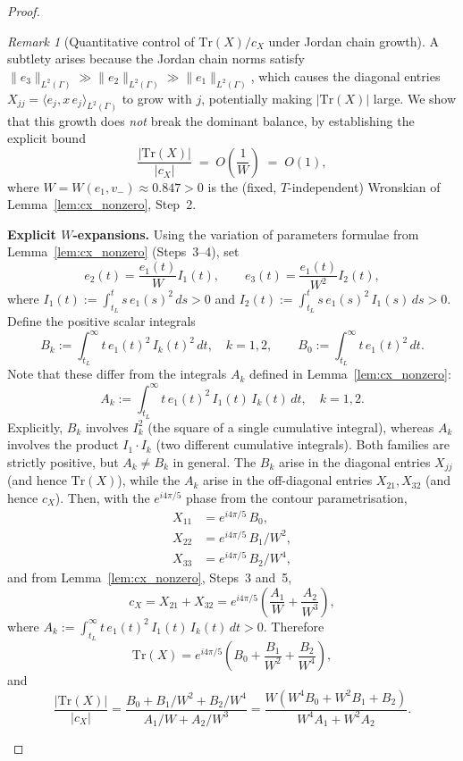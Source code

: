 \documentclass[12pt,a4paper]{amsart}
\theoremstyle{remark}
\newtheorem{remark}[theorem]{Remark}
\begin{document}
\begin{proof}
\begin{remark}[Quantitative control of $\mathrm{Tr}(X)/c_X$ under Jordan chain growth]
\label{rem:TrX_bound}
A subtlety arises because the Jordan chain norms satisfy
$\|e_3\|_{L^2(\Gamma)} \gg \|e_2\|_{L^2(\Gamma)} \gg \|e_1\|_{L^2(\Gamma)}$,
which causes the diagonal entries $X_{jj} = \langle e_j, x\, e_j\rangle_{L^2(\Gamma)}$
to grow with $j$, potentially making $|\mathrm{Tr}(X)|$ large.
We show that this growth does \emph{not} break the dominant balance, by
establishing the explicit bound
\begin{equation}\label{eq:TrX_cx_bound}
  \frac{|\mathrm{Tr}(X)|}{|c_X|} \;=\; O\!\left(\frac{1}{W}\right)
  \;=\; O(1),
\end{equation}
where $W = W(e_1, v_-) \approx 0.847 > 0$ is the (fixed, $T$-independent) Wronskian
of Lemma~\ref{lem:cx_nonzero}, Step~2.

\medskip
\noindent\textbf{Explicit $W$-expansions.}
Using the variation of parameters formulae from Lemma~\ref{lem:cx_nonzero}
(Steps~3--4), set
\[
  e_2(t) = \frac{e_1(t)}{W}I_1(t), \qquad
  e_3(t) = \frac{e_1(t)}{W^2}I_2(t),
\]
where $I_1(t) := \int_{t_L}^t s\,e_1(s)^2\,ds > 0$ and
$I_2(t) := \int_{t_L}^t s\,e_1(s)^2\,I_1(s)\,ds > 0$.
Define the positive scalar integrals
\[
  B_k := \int_{t_L}^\infty t\,e_1(t)^2\,I_k(t)^2\,dt, \quad k = 1,2,
  \qquad
  B_0 := \int_{t_L}^\infty t\,e_1(t)^2\,dt.
\]
Note that these differ from the integrals $A_k$ defined in Lemma~\ref{lem:cx_nonzero}:
\[
  A_k := \int_{t_L}^\infty t\,e_1(t)^2\,I_1(t)\,I_k(t)\,dt, \quad k = 1,2.
\]
Explicitly, $B_k$ involves $I_k^2$ (the square of a single cumulative integral),
whereas $A_k$ involves the product $I_1 \cdot I_k$ (two different cumulative integrals).
Both families are strictly positive, but $A_k \neq B_k$ in general.
The $B_k$ arise in the diagonal entries $X_{jj}$ (and hence $\mathrm{Tr}(X)$),
while the $A_k$ arise in the off-diagonal entries $X_{21}, X_{32}$ (and hence $c_X$).
Then, with the $e^{i4\pi/5}$ phase from the contour parametrisation,
\begin{align*}
  X_{11} &= e^{i4\pi/5}\,B_0, \\
  X_{22} &= e^{i4\pi/5}\,B_1/W^2, \\
  X_{33} &= e^{i4\pi/5}\,B_2/W^4,
\end{align*}
and from Lemma~\ref{lem:cx_nonzero}, Steps~3 and~5,
\[
  c_X = X_{21}+X_{32} = e^{i4\pi/5}\!\left(\frac{A_1}{W} + \frac{A_2}{W^3}\right),
\]
where $A_k := \int_{t_L}^\infty t\,e_1(t)^2\,I_1(t)\,I_k(t)\,dt > 0$.
Therefore
\[
  \mathrm{Tr}(X) = e^{i4\pi/5}\!\left(B_0 + \frac{B_1}{W^2} + \frac{B_2}{W^4}\right),
\]
and
\begin{equation}\label{eq:TrX_cx_ratio}
  \frac{|\mathrm{Tr}(X)|}{|c_X|}
  = \frac{B_0 + B_1/W^2 + B_2/W^4}{A_1/W + A_2/W^3}
  = \frac{W(W^4 B_0 + W^2 B_1 + B_2)}{W^4 A_1 + W^2 A_2}.
\end{equation}


\end{remark}
\end{proof}
\end{document}
